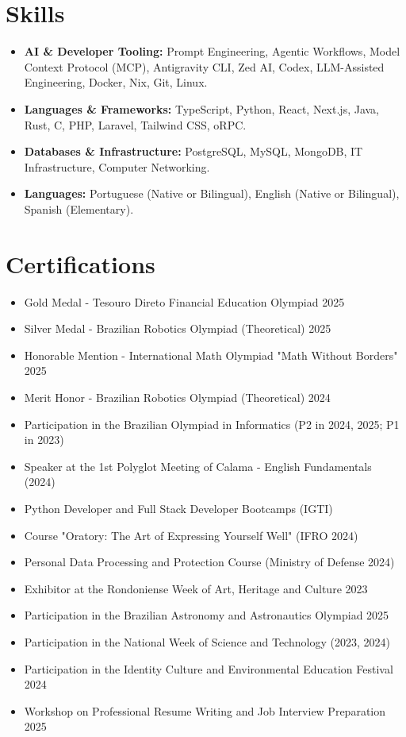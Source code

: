 \documentclass[a4paper,10pt]{article}
\begin{document}
\section{Skills}
    \begin{itemize}
        \item \textbf{AI \& Developer Tooling:} Prompt Engineering, Agentic Workflows, Model Context Protocol (MCP), Antigravity CLI, Zed AI, Codex, LLM-Assisted Engineering, Docker, Nix, Git, Linux.
        \item \textbf{Languages \& Frameworks:} TypeScript, Python, React, Next.js, Java, Rust, C, PHP, Laravel, Tailwind CSS, oRPC.
        \item \textbf{Databases \& Infrastructure:} PostgreSQL, MySQL, MongoDB, IT Infrastructure, Computer Networking.
        \item \textbf{Languages:} Portuguese (Native or Bilingual), English (Native or Bilingual), Spanish (Elementary).
    \end{itemize}

\section{Certifications}
    \begin{itemize}
        \item Gold Medal - Tesouro Direto Financial Education Olympiad 2025
        \item Silver Medal - Brazilian Robotics Olympiad (Theoretical) 2025
        \item Honorable Mention - International Math Olympiad "Math Without Borders" 2025
        \item Merit Honor - Brazilian Robotics Olympiad (Theoretical) 2024
        \item Participation in the Brazilian Olympiad in Informatics (P2 in 2024, 2025; P1 in 2023)
        \item Speaker at the 1st Polyglot Meeting of Calama - English Fundamentals (2024)
        \item Python Developer and Full Stack Developer Bootcamps (IGTI)
        \item Course "Oratory: The Art of Expressing Yourself Well" (IFRO 2024)
        \item Personal Data Processing and Protection Course (Ministry of Defense 2024)
        \item Exhibitor at the Rondoniense Week of Art, Heritage and Culture 2023
        \item Participation in the Brazilian Astronomy and Astronautics Olympiad 2025
        \item Participation in the National Week of Science and Technology (2023, 2024)
        \item Participation in the Identity Culture and Environmental Education Festival 2024
        \item Workshop on Professional Resume Writing and Job Interview Preparation 2025
    \end{itemize}
\end{document}

